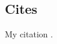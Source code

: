 \documentclass[../main.tex]{subfiles}
\begin{document}
\subsection{Cites}

My citation \cite{noauthor_docker-docs_2023}.
\end{document}
